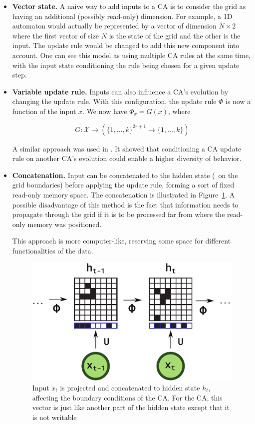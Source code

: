 \begin{itemize}
  \item \textbf{Vector state.} A naive way to add inputs to a \ac{CA} is to
        consider the grid as having an additional (possibly read-only)
        dimension. For example, a 1D automaton would actually be represented by
        a vector of dimension $N\times 2$ where the first vector of size $N$ is the
        state of the grid and the other is the input. The update rule would be
        changed to add this new component into account. One can see this model
        as using multiple CA rules at the same time, with the input state
        conditioning the rule being chosen for a given update step.

  \item \textbf{Variable update rule.} Inputs can also influence a CA's evolution by
        changing the update rule. With this configuration, the update rule $\Phi$
        is now a function of the input $x$. We now have $\Phi_x = G(x)$, where

        \[G: \mathcal{X} \rightarrow \left({\{ 1, \ldots, k \}}^{2r+1} \to \{1, \ldots, k\}\right)\]


        A similar approach was used in
        \parencite{adamsFormalDefinitionsUnbounded2017}. It showed that
        conditioning a CA update rule on another CA's evolution could enable a
        higher diversity of behavior.

  \item \textbf{Concatenation.} Input can be concatenated to the hidden state (\eg~on
        the grid boundaries) before applying the update rule, forming a sort of
        fixed read-only memory space. The concatenation is illustrated in
        Figure~\ref{fig:concat}. A possible disadvantage of this method is the
        fact that information needs to propagate through the grid if it is to be
        processed far from where the read-only memory was positioned.

        This approach is more computer-like, reserving some space for different
        functionalities of the data.

\begin{figure}[ht]
  \centering \includegraphics[width=.5\linewidth]{figures/concat.pdf}
  \caption{\label{fig:concat} Input $x_t$ is projected and concatenated to
    hidden state $h_t$, affecting the boundary conditions of the 
    \ac{CA}. For the \ac{CA}, this vector is just like another part of the
    hidden state except that it is not writable}
\end{figure}
\end{itemize}


